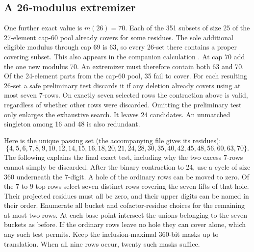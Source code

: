 \subsection*{A 26-modulus extremizer}
One further exact value is $m(26)=70$. Each of the 351 subsets of size 25 of the 27-element cap-60 pool already covers for some residues. The sole additional eligible modulus through cap 69 is 63, so every 26-set there contains a proper covering subset. This also appears in the companion calculation \cite{parallel}. At cap 70 add the one new modulus 70. An extremizer must therefore contain both 63 and 70. Of the 24-element parts from the cap-60 pool, 35 fail to cover. For each resulting 26-set a safe preliminary test discards it if any deletion already covers using at most seven 7-rows. On exactly seven selected rows the contraction above is valid, regardless of whether other rows were discarded. Omitting the preliminary test only enlarges the exhaustive search. It leaves 24 candidates. An unmatched singleton among 16 and 48 is also redundant.

Here is the unique passing set (the accompanying file gives its residues):
\[
 \{4,5,6,7,8,9,10,12,14,15,16,18,20,21,24,28,30,35,40,42,45,48,56,60,63,70\}.
\]
The following explains the final exact test, including why the two excess 7-rows cannot simply be discarded. After the binary contraction to 24, use a cycle of size 360 underneath the 7-digit. A hole of the ordinary rows can be moved to zero. Of the $7$ to $9$ top rows select seven distinct rows covering the seven lifts of that hole. Their projected residues must all be zero, and their upper digits can be named in their order. Enumerate all bucket and cofactor-residue choices for the remaining at most two rows. At each base point intersect the unions belonging to the seven buckets as before. If the ordinary rows leave no hole they can cover alone, which any such test permits. Keep the inclusion-maximal 360-bit masks up to translation. When all nine rows occur, twenty such masks suffice.

